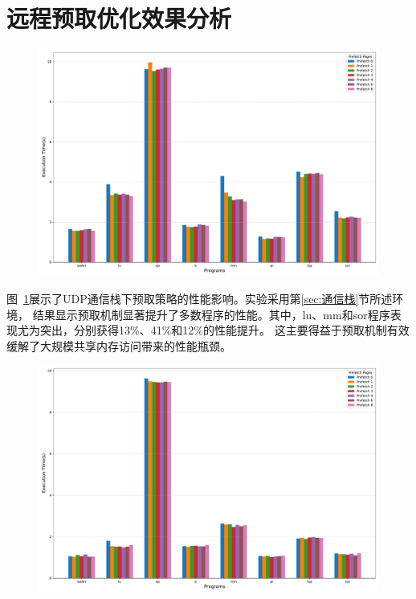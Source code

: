 {    \section{远程预取优化效果分析}\label{sec:远程预取优化效果分析}
    \begin{figure}[!htbp]
        \centering
        \includegraphics[width=0.90\linewidth]{Img/udp_prefetch_execution_time.pdf}
        \label{fig:udp-prefetch-result}
    \end{figure}
    图~\ref{fig:udp-prefetch-result}展示了UDP通信栈下预取策略的性能影响。实验采用第\ref{sec:通信栈}节所述环境，
    结果显示预取机制显著提升了多数程序的性能。其中，lu、mm和sor程序表现尤为突出，分别获得13\%、41\%和12\%的性能提升。
    这主要得益于预取机制有效缓解了大规模共享内存访问带来的性能瓶颈。

    \begin{figure}
        \centering
        \includegraphics[width=0.90\linewidth]{Img/rdma_prefetch_execution_time.pdf}
        \label{fig:rdma-prefetch-result}
    \end{figure}

}
